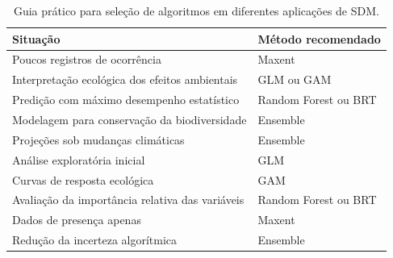 \documentclass{ueap-sdm}
\begin{document}
\begin{table}[H]
	\centering
	\caption{Guia prático para seleção de algoritmos em diferentes aplicações de SDM.}
	\label{tab:guia_escolha_algoritmos}
	
	\small
	
	\begin{tabular}{
			p{}
			p{}
		}
		
		\toprule
		\textbf{Situação} &
		\textbf{Método recomendado} \\
		\midrule
		
		Poucos registros de ocorrência &
		Maxent \\
		
		Interpretação ecológica dos efeitos ambientais &
		GLM ou GAM \\
		
		Predição com máximo desempenho estatístico &
		Random Forest ou BRT \\
		
		Modelagem para conservação da biodiversidade &
		Ensemble \\
		
		Projeções sob mudanças climáticas &
		Ensemble \\
		
		Análise exploratória inicial &
		GLM \\
		
		Curvas de resposta ecológica &
		GAM \\
		
		Avaliação da importância relativa das variáveis &
		Random Forest ou BRT \\
		
		Dados de presença apenas &
		Maxent \\
		
		Redução da incerteza algorítmica &
		Ensemble \\
		
		\bottomrule
		
	\end{tabular}
	
\end{table}

\begin{center}
\end{center}
\end{document}
